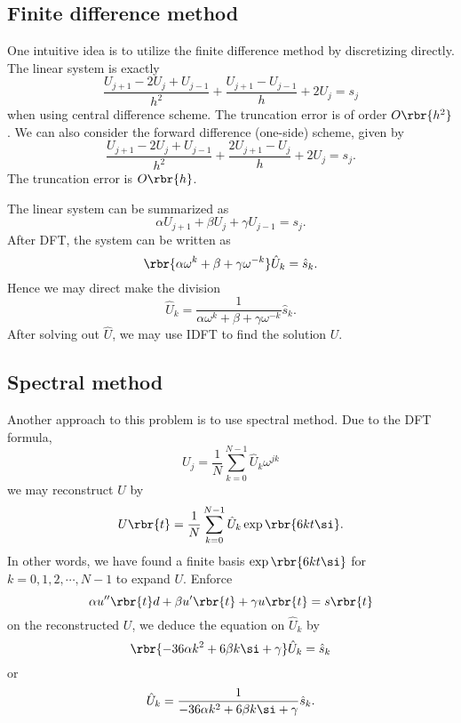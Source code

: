 \documentclass[english, nochinese]{pnote}
\begin{document}
\subsection{Finite difference method}

One intuitive idea is to utilize the finite difference method by discretizing directly. The linear system is exactly
\begin{equation}
\frac{ U_{ j + 1 } - 2 U_j + U_{ j - 1 } }{h^2} + \frac{ U_{ j + 1 } - U_{ j - 1 } }{h} + 2 U_j = s_j
\end{equation}
when using central difference scheme. The truncation error is of order $ O \rbr{h^2} $. We can also consider the forward difference (one-side) scheme, given by
\begin{equation}
\frac{ U_{ j + 1 } - 2 U_j + U_{ j - 1 } }{h^2} + \frac{ 2 U_{ j + 1 } - U_j }{h} + 2 U_j = s_j.
\end{equation}
The truncation error is $ O \rbr{h} $.

The linear system can be summarized as
\begin{equation}
\alpha U_{ j + 1 } + \beta U_j + \gamma U_{ j - 1 } = s_j.
\end{equation}
After DFT, the system can be written as
\begin{equation}
\rbr{ \alpha \omega^k + \beta + \gamma \omega^{-k} } \hat{U}_k = \hat{s}_k.
\end{equation}
Hence we may direct make the division
\begin{equation}
\hat{U}_k = \frac{1}{ \alpha \omega^k + \beta + \gamma \omega^{-k} } \hat{s}_k.
\end{equation}
After solving out $\hat{U}$, we may use IDFT to find the solution $U$.

\subsection{Spectral method}

Another approach to this problem is to use spectral method. Due to the DFT formula,
\begin{equation}
U_j = \frac{1}{N} \sum_{ k = 0 }^{ N - 1 } \hat{U}_k \omega^{ j k } 
\end{equation}
we may reconstruct $U$ by
\begin{equation}
U \rbr{t} = \frac{1}{N} \sum_{ k = 0 }^{ N - 1 } \hat{U}_k \exp \rbr{ 6 k t \si }.
\end{equation}
In other words, we have found a finite basis $ \exp \rbr{ 6 k t \si } $ for $ k = 0, 1, 2, \cdots, N - 1 $ to expand $U$. Enforce
\begin{equation}
\alpha u'' \rbr{t} d+ \beta u' \rbr{t} + \gamma u \rbr{t} = s \rbr{t}
\end{equation}
on the reconstructed $U$, we deduce the equation on $\hat{U}_k$ by
\begin{equation}
\rbr{ -36 \alpha k^2 + 6 \beta k \si + \gamma } \hat{U}_k = \hat{s}_k
\end{equation}
or
\begin{equation}
\hat{U}_k = \frac{1}{ -36 \alpha k^2 + 6 \beta k \si + \gamma } \hat{s}_k.
\end{equation}
\end{document}
